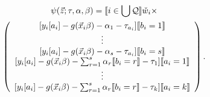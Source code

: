 \documentclass{article}
\DeclarePairedDelimiter{\indicator}{\llbracket}{\rrbracket}
\newcommand{\owt}[1][{[a_i]}]{\ensuremath{\check{w}_{i#1}}}
\begin{document}
\begin{multline}
  \label{eq:9}
  \psi(\vec{z}; \tau, \alpha, \beta) =
  \indicator{i \in \bigcup \mathcal{Q}} \owt[]\times \\  
  \left(
    \begin{array}{c}
           [y_{i}[a_{i}] - g(\vec{x}_{i}\beta)-
                  \alpha_{1} -
      \tau_{a_{i}}]\indicator{b_{i}=1}\\
      \vdots\\ 
          {} [y_{i}[a_{i}] - g(\vec{x}_{i}\beta)-
                  \alpha_{s} -
      \tau_{a_{i}}]\indicator{b_{i}=s}\\      
         {}  [y_{i}[a_{i}] - g(\vec{x}_{i}\beta)-
                  \sum_{r=1}^s\alpha_r\indicator{b_i=r}-\tau_{1}]\indicator{a_{i}=1}\\
                  \vdots \\
          {} [y_{i}[a_{i}] - g(\vec{x}_{i}\beta)-
                 \sum_{r=1}^s\alpha_r\indicator{b_i=r} - \tau_{k}]\indicator{a_{i}=k}\\
    \end{array}
\right).
\end{multline}
\end{document}
